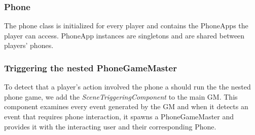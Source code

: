 \documentclass[11pt, a4paper, logo, twocolumn, internal, copyright, numbering]{googledeepmind}
\begin{document}
\subsubsection{Phone}
The phone class is initialized for every player and contains the PhoneApps the player can access. PhoneApp instances are singletons and are shared between players' phones.
\subsubsection{Triggering the nested PhoneGameMaster}
To detect that a player's action involved the phone a should run the the nested phone game, we add the \textit{SceneTriggeringComponent} to the main GM. This component examines every event generated by the GM and when it detects an event that requires phone interaction, it spawns a PhoneGameMaster and provides it with the interacting user and their corresponding Phone.
\end{document}
